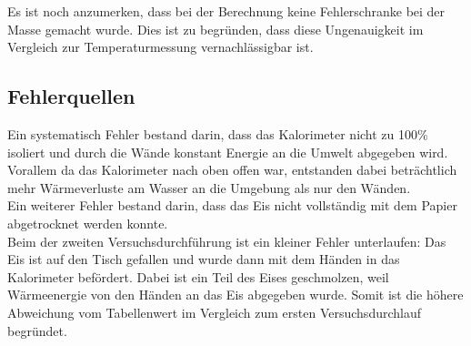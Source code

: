 \documentclass[a4paper,12pt]{article}
\begin{document}
Es ist noch anzumerken, dass bei der Berechnung keine Fehlerschranke bei der Masse gemacht wurde. Dies ist zu begründen, dass diese Ungenauigkeit im Vergleich zur Temperaturmessung vernachlässigbar ist.

\subsection{Fehlerquellen}

Ein systematisch Fehler bestand darin, dass das Kalorimeter nicht zu 100\% isoliert und durch die Wände konstant Energie an die Umwelt abgegeben wird. Vorallem da das Kalorimeter nach oben offen war, entstanden dabei beträchtlich mehr Wärmeverluste am Wasser an die Umgebung als nur den Wänden.\\

Ein weiterer Fehler bestand darin, dass das Eis nicht vollständig mit dem Papier abgetrocknet werden konnte.\\

Beim der zweiten Versuchsdurchführung ist ein kleiner Fehler unterlaufen: Das Eis ist auf den Tisch gefallen und wurde dann mit dem Händen in das Kalorimeter befördert. Dabei ist ein Teil des Eises geschmolzen, weil Wärmeenergie von den Händen an das Eis abgegeben wurde. Somit ist die höhere Abweichung vom Tabellenwert im Vergleich zum ersten Versuchsdurchlauf begründet.
\end{document}

